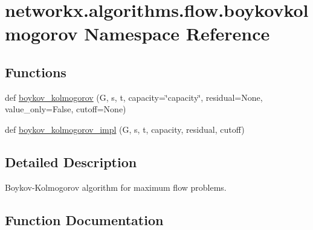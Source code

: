\hypertarget{namespacenetworkx_1_1algorithms_1_1flow_1_1boykovkolmogorov}{}\section{networkx.\+algorithms.\+flow.\+boykovkolmogorov Namespace Reference}
\label{namespacenetworkx_1_1algorithms_1_1flow_1_1boykovkolmogorov}
\subsection*{Functions}
\begin{DoxyCompactItemize}
\item 
def \hyperlink{namespacenetworkx_1_1algorithms_1_1flow_1_1boykovkolmogorov_a8f1c106307274cf892cfe47fe915f5da}{boykov\+\_\+kolmogorov} (G, s, t, capacity=\char`\"{}capacity\char`\"{}, residual=None, value\+\_\+only=False, cutoff=None)
\item 
def \hyperlink{namespacenetworkx_1_1algorithms_1_1flow_1_1boykovkolmogorov_af0a08cc4141de23cb0415f72f6a756c5}{boykov\+\_\+kolmogorov\+\_\+impl} (G, s, t, capacity, residual, cutoff)
\end{DoxyCompactItemize}


\subsection{Detailed Description}
\begin{DoxyVerb}Boykov-Kolmogorov algorithm for maximum flow problems.
\end{DoxyVerb}
 

\subsection{Function Documentation}
\mbox{\label{namespacenetworkx_1_1algorithms_1_1flow_1_1boykovkolmogorov_a8f1c106307274cf892cfe47fe915f5da}} 
